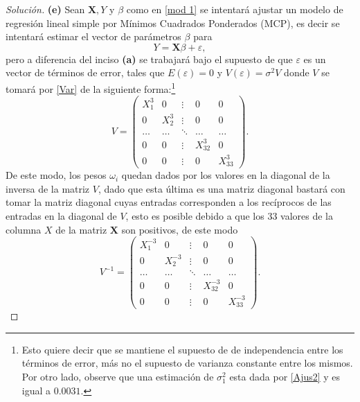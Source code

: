 \documentclass[10.5pt,notitlepage]{article}
\newenvironment{solucion}
  {\begin{proof}[Solución]}
  {\end{proof}}
\newcommand{\ee}{\varepsilon}
\theoremstyle{plain}
\begin{document}
\begin{solucion}
\noindent \textbf{(e)} Sean \(\mathbf{X},Y\) y \(\beta\) como en \eqref{mod 1} se intentará ajustar un modelo de regresión lineal simple por Mínimos Cuadrados Ponderados (MCP), es decir se intentará estimar el vector de parámetros \(\beta\) para 
\begin{equation}\label{model2}
    Y = \mathbf{X} \beta + \ee, 
\end{equation}
pero a diferencia del inciso \textbf{(a)} se trabajará bajo el supuesto de que \(\ee\) es un vector de términos de error, tales que \(E(\ee) = 0 \) y \(V(\ee) = \sigma^2 V\) donde \(V\) se tomará por \eqref{Var} de la siguiente forma:\footnote{Esto quiere decir que se mantiene el supuesto de de independencia entre los términos de error, más no el supuesto de varianza constante entre los mismos. Por otro lado, observe que una estimación de \(\sigma_1^{2}\) esta dada por \eqref{Ajus2} y es igual a \(0.0031\).} 
\begin{equation}\label{VV}
V =\begin{pmatrix}
       X_{1}^{3} & 0      & \vdots  & 0 &0 \\ 
      0 &  X_{2}^{3}   & \vdots  & 0 &0 \\ 
      \hdots & \hdots & \ddots  & \hdots &\hdots \\ 
      0 & 0           & \vdots  &    X_{32}^{3} &0 \\ 
      0 & 0           & \vdots  & 0 &  X_{33}^{3}
\end{pmatrix}.
\end{equation}
De este modo, los pesos \(\omega_i\) quedan dados por los valores en la diagonal de la inversa de la matriz \(V\), dado que esta última es una matriz diagonal bastará con tomar la matriz diagonal cuyas entradas corresponden a los recíprocos de las entradas en la diagonal de \(V\), esto es posible debido a que los 33 valores de la columna \(X\) de la matriz \(\mathbf{X}\) son positivos, de este modo 
\begin{equation}
    V^{-1} =\begin{pmatrix}
      X_{1}^{-3} & 0      & \vdots  & 0 &0 \\ 
      0 &  X_{2}^{-3}   & \vdots  & 0 &0 \\ 
      \hdots & \hdots & \ddots  & \hdots &\hdots \\ 
      0 & 0           & \vdots  &    X_{32}^{-3} &0 \\ 
      0 & 0           & \vdots  & 0 &  X_{33}^{-3} 
\end{pmatrix}.
\end{equation}

\end{solucion}
\end{document}
